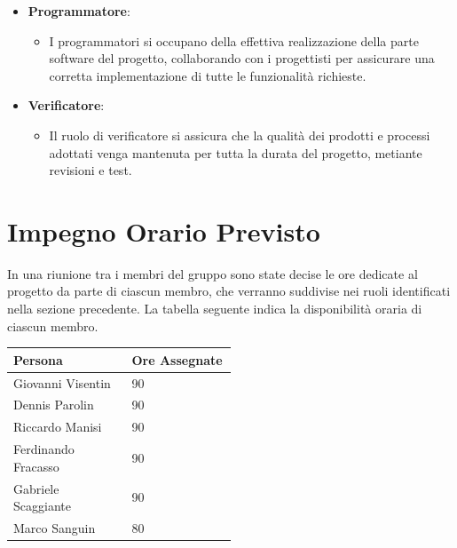 \documentclass[a4paper,12pt]{article}
\begin{document}
\begin{itemize}
    \item \textbf{Programmatore}:
        \begin{itemize}
            \item I programmatori si occupano della effettiva realizzazione della parte software del progetto, collaborando con i progettisti per assicurare una corretta implementazione di tutte le funzionalità richieste.
        \end{itemize}

    \item \textbf{Verificatore}:
        \begin{itemize}
            \item Il ruolo di verificatore si assicura che la qualità dei prodotti e processi adottati venga mantenuta per tutta la durata del progetto, metiante revisioni e test.
        \end{itemize}
\end{itemize}

\section{Impegno Orario Previsto}
In una riunione tra i membri del gruppo sono state decise le ore dedicate al progetto da parte di ciascun membro, che verranno suddivise nei ruoli identificati nella sezione precedente.
La tabella seguente indica la disponibilità oraria di ciascun membro.
\begin{center}
    \small
    \renewcommand{\arraystretch}{1.2} 
    \begin{tabular}{|p{0.30\linewidth}|p{0.20\linewidth}|}
        \hline
        \rowcolor{gray!60} 
        \textbf{Persona} & \textbf{Ore Assegnate}\\
        \hline
        \rowcolor{white}
        Giovanni Visentin & 90 \\
        \hline
        \rowcolor{gray!20}
        Dennis Parolin & 90 \\
        \hline
        \rowcolor{white}
        Riccardo Manisi	& 90 \\
        \hline
        \rowcolor{gray!20}
        Ferdinando Fracasso & 90 \\
        \hline
        \rowcolor{white}
        Gabriele Scaggiante & 90 \\
        \hline
        \rowcolor{gray!20}
        Marco Sanguin & 80 \\
        \hline
    \end{tabular}
\end{center}
\end{document}
